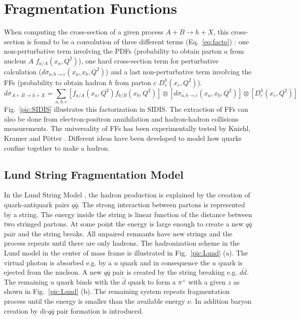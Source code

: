 
\section{Fragmentation Functions}\label{sec:FF}

When computing the cross-section of a given process $A+B \rightarrow h+X$, this cross-section is found to be a convolution of three different terms (Eq.~\ref{eq:facto}) : one non-perturbative term involving the PDFs (probability to obtain parton $a$ from nucleus $A$ $f_{a/A}(x_a,Q^2)$), one hard cross-section term for perturbative calculation ($d\sigma_{a,b \rightarrow c}(x_a,x_b,Q^2)$) and a last non-perturbative term involving the FFs (probability to obtain hadron $h$ from parton $c$ $D^h_c(x_c,Q^2)$).
%
\begin{equation}
  d\sigma_{A+B \rightarrow h+X} = \sum_{a,b,c} \left[ f_{a/A}(x_a,Q^2) f_{b/B}(x_b,Q^2) \right] \otimes \left[ d\sigma_{a,b \rightarrow c}(x_a,x_b,Q^2) \right] \otimes \left[ D^h_c(x_c,Q^2) \right]
  \label{eq:facto}
\end{equation}
%
Fig.~\ref{pic:SIDIS} illustrates this factorization in SIDIS. The extraction of FFs can also be done from electron-positron annihilation and hadron-hadron collisions measurements. The universality of FFs has been experimentally tested by Kniehl, Kramer and Pötter \cite{Universality}. Different ideas have been developed to model how quarks confine together to make a hadron.

\subsection{Lund String Fragmentation Model}

In the Lund String Model \cite{LUND}, the hadron production is explained by the creation of quark-antiquark pairs $q\bar{q}$. The strong interaction between partons is represented by a string. The energy inside the string is linear function of the distance between two stringed partons. At some point the energy is large enough to create a new $q\bar{q}$ pair and the string breaks. All unpaired remnants have new strings and the process repeats until there are only hadrons. The hadronization scheme in the Lund model in the center of mass frame is illustrated in Fig.~\ref{pic:Lund} (a). The virtual photon is absorbed e.g. by a $u$ quark and in consequence the $u$ quark is ejected from the nucleon. A new $q\bar{q}$ pair is created by the string breaking e.g. $d\bar{d}$. The remaining $u$ quark binds with the $\bar{d}$ quark to form a $\pi^+$ with a given $z$ as shown in Fig.~\ref{pic:Lund} (b). The remaining system repeats fragmentation process until the energy is smaller than the available energy $\nu$. In addition baryon creation by di-$q\bar{q}$ pair formation is introduced.

